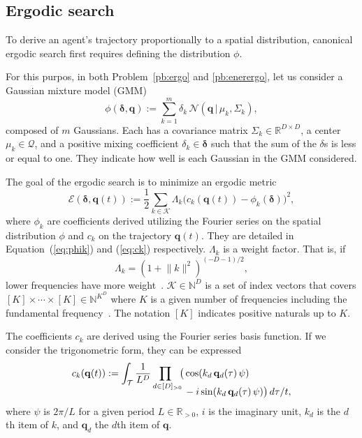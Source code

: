 \documentclass[letterpaper,10pt,conference,twoside]{IEEEtran}
\theoremstyle{definition}
\begin{document}
\subsection{Ergodic search}\label{sec:ergosearch}
\noindent
To derive an agent's trajectory proportionally to a spatial distribution, canonical ergodic search first requires defining the distribution $\phi$.

For this purpos, in both Problem~\ref{pb:ergo} and \ref{pb:enerergo}, let us consider a Gaussian mixture model (GMM)
\begin{equation}\label{eq:gmm}
  \phi(\boldsymbol{\delta},\mathbf{q}):=\sum_{k=1}^{m}\delta_k\,\mathcal{N}(\mathbf{q}\,|\,\mu_k,\Sigma_k),
\end{equation} 
composed of $m$ Gaussians. Each has a covariance matrix ${\Sigma_k}\in\mathbb{R}^{D\times D}$, a center $\mu_k\in\mathcal{Q}$, and a positive mixing coefficient $\delta_k\in\boldsymbol{\delta}$ such that the sum of the $\delta$s is less or equal to one. They indicate how well is each Gaussian in the GMM considered. 

The goal of the ergodic search is to minimize an ergodic metric~\cite{mathew2011metrics}
\begin{equation}\label{eq:ergmetric}
  \mathcal{E}(\boldsymbol{\delta},\mathbf{q}(t)):=\frac{1}{2}\sum_{k\in\mathcal{K}}\Lambda_k \big( c_k(\mathbf{q}(t))-\phi_k(\boldsymbol{\delta}) \big)^2,
\end{equation}
where $\phi_k$ are coefficients derived utilizing the Fourier series on the spatial distribution $\phi$ and $c_k$ on the trajectory $\mathbf{q}(t)$. They are detailed in Equation~(\ref{eq:phik}) and (\ref{eq:ck}) respectively.
$\Lambda_k$ is a weight factor. That is, if 
\begin{equation}
  \Lambda_k=(1+\lVert k\rVert^2)^{(-D-1)/2},
\end{equation}
lower frequencies have more weight~\cite{miller2016ergodic}.
$\mathcal{K}\in\mathbb{N}^D$ is a set of index vectors that covers $[K]\times\cdots\times[K]\in\mathbb{N}^{K^D}$ 
where $K$ is a given number of frequencies including the fundamental frequency~\cite{calinon2020mixture}. The notation $[K]$ indicates positive naturals up to $K$.

The coefficients $c_k$ are derived using the Fourier series basis function. If we consider the trigonometric form, they can be expressed
\begin{equation}\label{eq:ck}
  \begin{split}
    c_k(\mathbf{q}(t)):=\int_{\mathcal{T}}\frac{1}{L^D}\prod_{d\in[D]_{>0}\hspace*{-1ex}}\big(& \cos(k_d\,\mathbf{q}_d(\tau)\,\psi)\\[-2ex]
    &\vspace*{-4ex}-i\sin(k_d\,\mathbf{q}_d(\tau)\,\psi) \big)\,d\tau/t,
  \end{split}
\end{equation}
where $\psi$ is $2\pi/L$ for a given period $L\in\mathbb{R}_{>0}$, $i$ is the imaginary unit, $k_d$ is the $d$th item of $k$, and $\mathbf{q}_d$ the $d$th item of $\mathbf{q}$.
\end{document}
